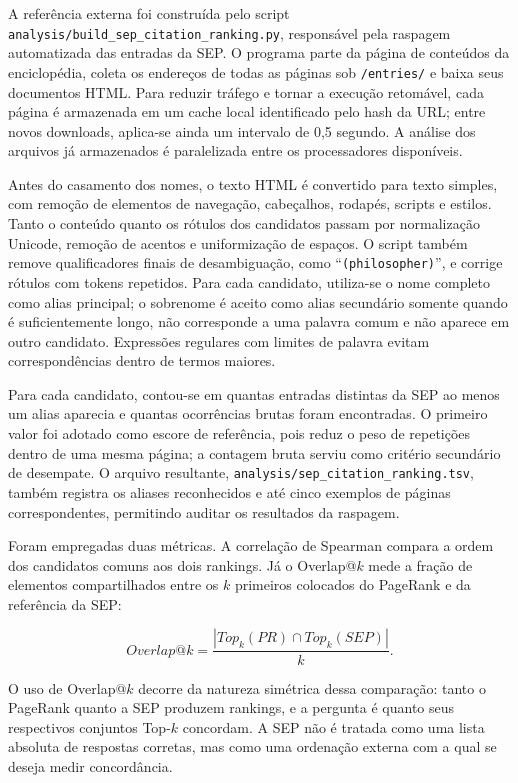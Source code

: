 \documentclass[10pt,a4paper]{article}
\begin{document}
A referência externa foi construída pelo script \texttt{analysis/build\_sep\_citation\_ranking.py}, responsável pela raspagem automatizada das entradas da SEP. O programa parte da página de conteúdos da enciclopédia, coleta os endereços de todas as páginas sob \texttt{/entries/} e baixa seus documentos HTML. Para reduzir tráfego e tornar a execução retomável, cada página é armazenada em um cache local identificado pelo hash da URL; entre novos downloads, aplica-se ainda um intervalo de 0,5 segundo. A análise dos arquivos já armazenados é paralelizada entre os processadores disponíveis.

Antes do casamento dos nomes, o texto HTML é convertido para texto simples, com remoção de elementos de navegação, cabeçalhos, rodapés, scripts e estilos. Tanto o conteúdo quanto os rótulos dos candidatos passam por normalização Unicode, remoção de acentos e uniformização de espaços. O script também remove qualificadores finais de desambiguação, como ``\texttt{(philosopher)}'', e corrige rótulos com tokens repetidos. Para cada candidato, utiliza-se o nome completo como alias principal; o sobrenome é aceito como alias secundário somente quando é suficientemente longo, não corresponde a uma palavra comum e não aparece em outro candidato. Expressões regulares com limites de palavra evitam correspondências dentro de termos maiores.

Para cada candidato, contou-se em quantas entradas distintas da SEP ao menos um alias aparecia e quantas ocorrências brutas foram encontradas. O primeiro valor foi adotado como escore de referência, pois reduz o peso de repetições dentro de uma mesma página; a contagem bruta serviu como critério secundário de desempate. O arquivo resultante, \texttt{analysis/sep\_citation\_ranking.tsv}, também registra os aliases reconhecidos e até cinco exemplos de páginas correspondentes, permitindo auditar os resultados da raspagem.

Foram empregadas duas métricas. A correlação de Spearman compara a ordem dos candidatos comuns aos dois rankings. Já o Overlap@$k$ mede a fração de elementos compartilhados entre os $k$ primeiros colocados do PageRank e da referência da SEP:

\begin{equation}
Overlap@k=\frac{|Top_k(PR)\cap Top_k(SEP)|}{k}.
\end{equation}

O uso de Overlap@$k$ decorre da natureza simétrica dessa comparação: tanto o PageRank quanto a SEP produzem rankings, e a pergunta é quanto seus respectivos conjuntos Top-$k$ concordam. A SEP não é tratada como uma lista absoluta de respostas corretas, mas como uma ordenação externa com a qual se deseja medir concordância.
\end{document}
